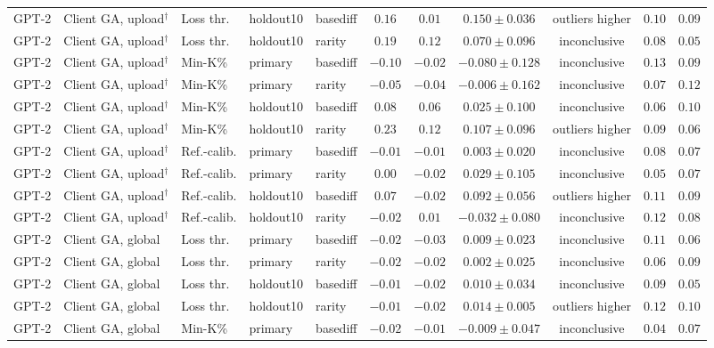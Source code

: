 {\begin{longtable}{@{\extracolsep{\fill}}lllllcccccc@{}}
GPT-2 & Client GA, upload$^{\dagger}$ & Loss thr. & holdout10 & basediff & $0.16$ & $0.01$ & $0.150 \pm 0.036$ & outliers higher & $0.10$ & $0.09$ \\
GPT-2 & Client GA, upload$^{\dagger}$ & Loss thr. & holdout10 & rarity & $0.19$ & $0.12$ & $0.070 \pm 0.096$ & inconclusive & $0.08$ & $0.05$ \\
GPT-2 & Client GA, upload$^{\dagger}$ & Min-K\% & primary & basediff & $-0.10$ & $-0.02$ & $-0.080 \pm 0.128$ & inconclusive & $0.13$ & $0.09$ \\
GPT-2 & Client GA, upload$^{\dagger}$ & Min-K\% & primary & rarity & $-0.05$ & $-0.04$ & $-0.006 \pm 0.162$ & inconclusive & $0.07$ & $0.12$ \\
GPT-2 & Client GA, upload$^{\dagger}$ & Min-K\% & holdout10 & basediff & $0.08$ & $0.06$ & $0.025 \pm 0.100$ & inconclusive & $0.06$ & $0.10$ \\
GPT-2 & Client GA, upload$^{\dagger}$ & Min-K\% & holdout10 & rarity & $0.23$ & $0.12$ & $0.107 \pm 0.096$ & outliers higher & $0.09$ & $0.06$ \\
GPT-2 & Client GA, upload$^{\dagger}$ & Ref.-calib. & primary & basediff & $-0.01$ & $-0.01$ & $0.003 \pm 0.020$ & inconclusive & $0.08$ & $0.07$ \\
GPT-2 & Client GA, upload$^{\dagger}$ & Ref.-calib. & primary & rarity & $0.00$ & $-0.02$ & $0.029 \pm 0.105$ & inconclusive & $0.05$ & $0.07$ \\
GPT-2 & Client GA, upload$^{\dagger}$ & Ref.-calib. & holdout10 & basediff & $0.07$ & $-0.02$ & $0.092 \pm 0.056$ & outliers higher & $0.11$ & $0.09$ \\
GPT-2 & Client GA, upload$^{\dagger}$ & Ref.-calib. & holdout10 & rarity & $-0.02$ & $0.01$ & $-0.032 \pm 0.080$ & inconclusive & $0.12$ & $0.08$ \\
GPT-2 & Client GA, global & Loss thr. & primary & basediff & $-0.02$ & $-0.03$ & $0.009 \pm 0.023$ & inconclusive & $0.11$ & $0.06$ \\
GPT-2 & Client GA, global & Loss thr. & primary & rarity & $-0.02$ & $-0.02$ & $0.002 \pm 0.025$ & inconclusive & $0.06$ & $0.09$ \\
GPT-2 & Client GA, global & Loss thr. & holdout10 & basediff & $-0.01$ & $-0.02$ & $0.010 \pm 0.034$ & inconclusive & $0.09$ & $0.05$ \\
GPT-2 & Client GA, global & Loss thr. & holdout10 & rarity & $-0.01$ & $-0.02$ & $0.014 \pm 0.005$ & outliers higher & $0.12$ & $0.10$ \\
GPT-2 & Client GA, global & Min-K\% & primary & basediff & $-0.02$ & $-0.01$ & $-0.009 \pm 0.047$ & inconclusive & $0.04$ & $0.07$ \\

\end{longtable}}
